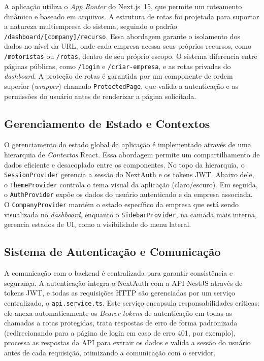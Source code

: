 A aplicação utiliza o \textit{App Router} do Next.js~15, que permite um roteamento dinâmico e baseado em arquivos. A estrutura de rotas foi projetada para suportar a natureza multiempresa do sistema, seguindo o padrão \texttt{/dashboard/[company]/recurso}. Essa abordagem garante o isolamento dos dados no nível da URL, onde cada empresa acessa seus próprios recursos, como \texttt{/motoristas} ou \texttt{/rotas}, dentro de seu próprio escopo. O sistema diferencia entre páginas públicas, como \texttt{/login} e \texttt{/criar-empresa}, e as rotas privadas do \textit{dashboard}. A proteção de rotas é garantida por um componente de ordem superior (\textit{wrapper}) chamado \texttt{ProtectedPage}, que valida a autenticação e as permissões do usuário antes de renderizar a página solicitada.

\subsection{Gerenciamento de Estado e Contextos}

O gerenciamento do estado global da aplicação é implementado através de uma hierarquia de \textit{Contextos} React. Essa abordagem permite um compartilhamento de dados eficiente e desacoplado entre os componentes. No topo da hierarquia, o \texttt{SessionProvider} gerencia a sessão do NextAuth e os tokens JWT. Abaixo dele, o \texttt{ThemeProvider} controla o tema visual da aplicação (claro/escuro). Em seguida, o \texttt{AuthProvider} expõe os dados do usuário autenticado e da empresa associada. O \texttt{CompanyProvider} mantém o estado específico da empresa que está sendo visualizada no \textit{dashboard}, enquanto o \texttt{SidebarProvider}, na camada mais interna, gerencia estados de UI, como a visibilidade do menu lateral.

\subsection{Sistema de Autenticação e Comunicação}

A comunicação com o backend é centralizada para garantir consistência e segurança. A autenticação integra o NextAuth com a API NestJS através de tokens JWT, e todas as requisições HTTP são gerenciadas por um serviço centralizado, o \texttt{api.service.ts}. Este serviço encapsula responsabilidades críticas: ele anexa automaticamente os \textit{Bearer tokens} de autenticação em todas as chamadas a rotas protegidas, trata respostas de erro de forma padronizada (redirecionando para a página de login em caso de erro 401, por exemplo), processa as respostas da API para extrair os dados e valida a sessão do usuário antes de cada requisição, otimizando a comunicação com o servidor.


